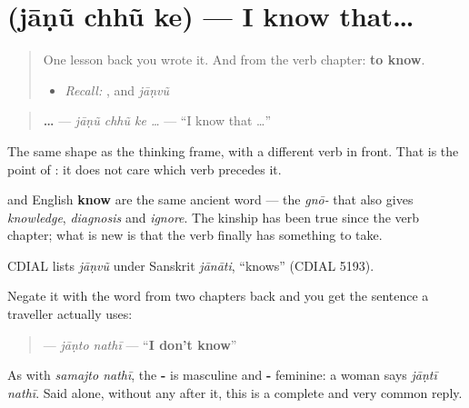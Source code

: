 \section[\texorpdfstring{\gu{જાણું} \gu{છું} \gu{કે} (jāṇũ chhũ ke)}{જાણું છું કે (jāṇũ chhũ ke)}]{   (jāṇũ chhũ ke) — I know that…}

\label{lesson:GU-C33-jaanun-ke}



\begin{quote}
One lesson back you wrote it. And from the verb chapter: \textbf{to know}.

\begin{itemize}
\raggedright
  \item \emph{Recall:} \textbf{}, and \emph{jāṇvũ}
\end{itemize}
\end{quote}

\begin{cousinweb}
\begin{quote}
\textbf{   …} — \emph{jāṇũ chhũ ke …} — \textquotedblleft{}I know that …\textquotedblright{}
\end{quote}

The same shape as the thinking frame, with a different verb in front. That is the point of \textbf{}: it does not care which verb precedes it.

\textbf{} and English \textbf{know} are the same ancient word — the \emph{gnō-} that also gives \emph{knowledge}, \emph{diagnosis} and \emph{ignore}. The kinship has been true since the verb chapter; what is new is that the verb finally has something to take.

CDIAL lists \emph{jāṇvũ} under Sanskrit \emph{jānāti}, \textquotedblleft{}knows\textquotedblright{} (CDIAL 5193).
\end{cousinweb}

\begin{grammarlens}[title={Grammar Lens: and the half you need more}]
Negate it with the word from two chapters back and you get the sentence a traveller actually uses:

\begin{quote}
\textbf{ } — \emph{jāṇto nathī} — \textquotedblleft{}\textbf{I don't know}\textquotedblright{}
\end{quote}

As with \emph{samajto nathī}, the \textbf{-} is masculine and \textbf{-} feminine: a woman says \emph{jāṇtī nathī}. Said alone, without any \textbf{} after it, this is a complete and very common reply.
\end{grammarlens}

